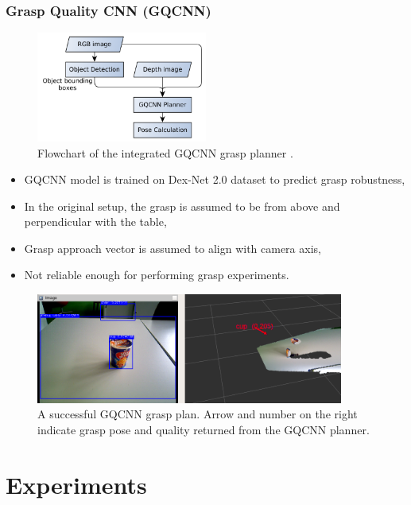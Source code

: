 \documentclass[runningheads]{../llncs}
\begin{document}
\subsubsection*{Grasp Quality CNN (GQCNN)}
\begin{figure}[h!]
    \centering
    \includegraphics[width=0.5\textwidth]{grasp_plan_gqcnn}
    \caption{Flowchart of the integrated GQCNN grasp planner \cite{mahler2017}.}
    \label{fig:grasp_plan_gqcnn}
\end{figure}

\begin{itemize}
    \item GQCNN model \cite{mahler2017} is trained on Dex-Net 2.0 dataset to predict grasp robustness,
    \item In the original setup, the grasp is assumed to be from above and perpendicular with the table,
    \item Grasp approach vector is assumed to align with camera axis,
    \item Not reliable enough for performing grasp experiments.
\end{itemize}

\begin{figure}[h!]
    \centering
    \includegraphics[width=0.9\textwidth]{grasp_gqcnn_result}
    \caption{A successful GQCNN grasp plan. Arrow and number on the right indicate grasp pose and quality returned from
             the GQCNN planner.}
    \label{fig:gqcnn_result}
\end{figure}

\section{Experiments} \label{section:experiments}
\end{document}

